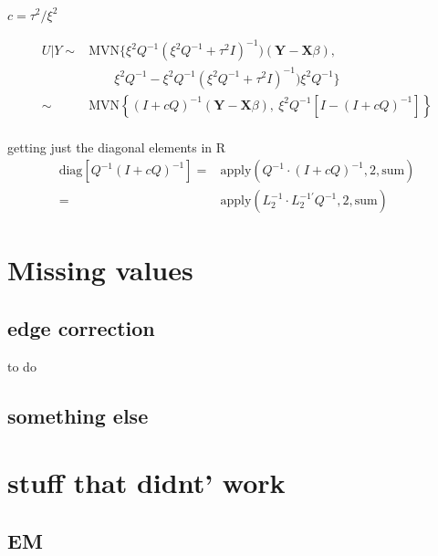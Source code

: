 \documentclass[12pt]{article}
\begin{document}
$c = \tau^2/\xi^2$

\begin{align*}
U|Y \sim & \text{MVN}\{\xi^2Q^{-1}(\xi^2 Q^{-1} + \tau^2 I)^{-1})
(\mathbf{Y} - \mathbf{X}\beta), \\
&\qquad
\xi^2Q^{-1}- \xi^2Q^{-1}( \xi^2Q^{-1} + \tau^2 I  )^{-1})\xi^2 Q^{-1} \}\\
\sim &\text{MVN}\left\{  ( I + c Q  )^{-1}  (\mathbf{Y} -
\mathbf{X}\beta),\ \xi^2 Q^{-1}[I- ( I + cQ  )^{-1}	 ] \right\}\\
\end{align*}

getting just the diagonal elements in R
\begin{align*}
\text{diag}\left[Q^{-1} ( I + c Q  )^{-1}\right]	= &
\text{apply}(Q^{-1} \cdot
( I + c Q  )^{-1}, 2,\text{sum})\\
= & \text{apply}(L_2^{-1}\cdot L_2^{-1\prime}Q^{-1},2,\text{sum})
\end{align*}


\section*{Missing values}

\subsection{edge correction}
to do

\subsection{something else}

\appendix

\section{stuff that didnt' work}


\subsection{EM}
\end{document}
